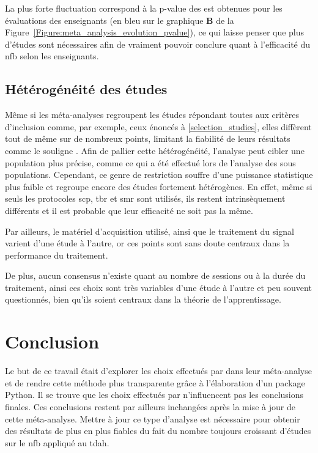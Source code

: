 La plus forte fluctuation correspond à la p-value des \gls{est} obtenues pour les évaluations des enseignants (en bleu sur le graphique \textbf{B} de 
la Figure~\ref{Figure:meta_analysis_evolution_pvalue}), ce qui laisse penser que plus d'études sont nécessaires afin de vraiment pouvoir conclure quant 
à l'efficacité du \gls{nfb} selon les enseignants.


\subsection{Hétérogénéité des études} 

Même si les méta-analyses regroupent les études répondant toutes aux critères d'inclusion comme, par exemple, ceux énoncés à \ref{selection_studies}, 
elles diffèrent tout de même sur de nombreux points, limitant la fiabilité de leurs résultats comme le souligne \citep{Alkoby2017}. Afin de pallier 
cette hétérogénéité, l'analyse peut cibler une population plus précise, comme ce qui a été effectué lors de l'analyse
des sous populations. Cependant, ce genre de restriction souffre d'une puissance statistique plus faible et regroupe encore des études fortement hétérogènes.
En effet, même si seuls les protocoles \gls{scp}, \gls{tbr} et \gls{smr} sont utilisés, ils restent intrinsèquement différents et il est probable que leur
efficacité ne soit pas la même. 

Par ailleurs, le matériel d'acquisition utilisé, ainsi que le traitement du signal varient d'une étude à l'autre, or ces points sont sans doute centraux 
dans la performance du traitement. 

De plus, aucun consensus n'existe quant au nombre de sessions ou à la durée du traitement, ainsi ces choix sont très variables d'une étude à l'autre et peu
souvent questionnés, bien qu'ils soient centraux dans la théorie de l'apprentissage.

\section{Conclusion}

Le but de ce travail était d'explorer les choix effectués par \citet{Cortese2016} dans leur méta-analyse et de rendre cette méthode plus transparente grâce
à l'élaboration d'un package Python. Il se trouve que les choix effectués par \citet{Cortese2016} n'influencent pas les conclusions finales. Ces conclusions
restent par ailleurs inchangées après la mise à jour de cette méta-analyse. Mettre à jour ce type d'analyse est nécessaire pour obtenir des résultats de plus
en plus fiables du fait du nombre toujours croissant d'études sur le \gls{nfb} appliqué au \gls{tdah}. 

